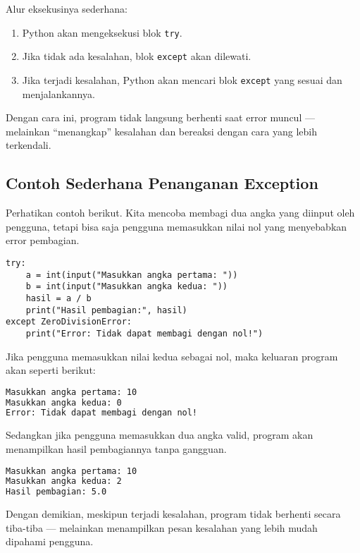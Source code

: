 Alur eksekusinya sederhana:
\begin{enumerate}
    \item Python akan mengeksekusi blok \texttt{try}.
    \item Jika tidak ada kesalahan, blok \texttt{except} akan dilewati.
    \item Jika terjadi kesalahan, Python akan mencari blok \texttt{except} yang sesuai dan menjalankannya.
\end{enumerate}

Dengan cara ini, program tidak langsung berhenti saat error muncul — melainkan “menangkap” kesalahan dan bereaksi dengan cara yang lebih terkendali.

\subsection*{Contoh Sederhana Penanganan Exception}

Perhatikan contoh berikut. Kita mencoba membagi dua angka yang diinput oleh pengguna, tetapi bisa saja pengguna memasukkan nilai nol yang menyebabkan error pembagian.

\begin{lstlisting}[style=PythonStyle, caption={Contoh sederhana penggunaan try-except}]
try:
    a = int(input("Masukkan angka pertama: "))
    b = int(input("Masukkan angka kedua: "))
    hasil = a / b
    print("Hasil pembagian:", hasil)
except ZeroDivisionError:
    print("Error: Tidak dapat membagi dengan nol!")
\end{lstlisting}

Jika pengguna memasukkan nilai kedua sebagai nol, maka keluaran program akan seperti berikut:

\begin{lstlisting}[language=bash]
Masukkan angka pertama: 10
Masukkan angka kedua: 0
Error: Tidak dapat membagi dengan nol!
\end{lstlisting}

Sedangkan jika pengguna memasukkan dua angka valid, program akan menampilkan hasil pembagiannya tanpa gangguan.

\begin{lstlisting}[language=bash]
Masukkan angka pertama: 10
Masukkan angka kedua: 2
Hasil pembagian: 5.0
\end{lstlisting}

Dengan demikian, meskipun terjadi kesalahan, program tidak berhenti secara tiba-tiba — melainkan menampilkan pesan kesalahan yang lebih mudah dipahami pengguna.

